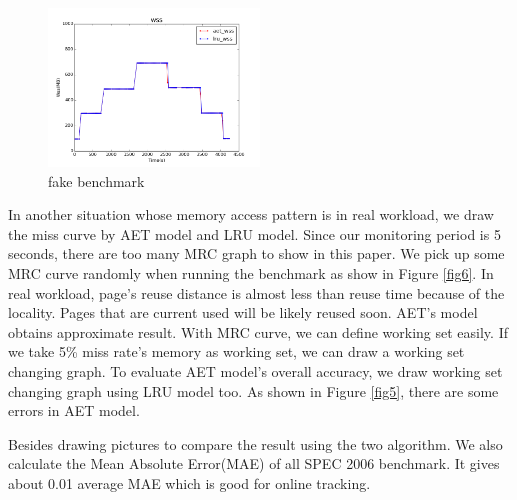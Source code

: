 \documentclass[10pt,twocolumn]{article}
\begin{document}
\begin{figure}[!htp]
	\caption{fake benchmark}
	\label{fig4}
	\includegraphics[width=0.5\textwidth]{img/aet_lru_cmp/aet_lru_cmp_fakestage.png}
\end{figure} 

In another situation whose memory access pattern is in real workload, we draw the miss curve by AET model and LRU model. Since our monitoring period is 5 seconds, there are too many MRC graph to show in this paper. We pick up some MRC curve randomly when running the benchmark as show in Figure \ref{fig6}. In real workload, page's reuse distance is almost less than reuse time because of the locality. Pages that are current used will be likely reused soon. AET's model obtains approximate result. With MRC curve, we can define working set easily. If we take 5\% miss rate's memory as working set, we can draw a working set changing graph. To evaluate AET model's overall accuracy, we draw working set changing graph using LRU model too. As shown in Figure \ref{fig5}, there are some errors in AET model.

Besides drawing pictures to compare the result using the two algorithm. We also calculate the Mean Absolute Error(MAE) of all SPEC 2006 benchmark. It gives about 0.01 average MAE which is good for online tracking.
\end{document}
